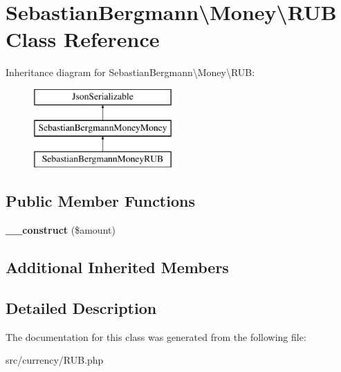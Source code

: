 \hypertarget{classSebastianBergmann_1_1Money_1_1RUB}{}\section{Sebastian\+Bergmann\textbackslash{}Money\textbackslash{}R\+U\+B Class Reference}
\label{classSebastianBergmann_1_1Money_1_1RUB}
Inheritance diagram for Sebastian\+Bergmann\textbackslash{}Money\textbackslash{}R\+U\+B\+:\begin{figure}[H]
\begin{center}
\leavevmode
\includegraphics[height=3.000000cm]{classSebastianBergmann_1_1Money_1_1RUB}
\end{center}
\end{figure}
\subsection*{Public Member Functions}
\begin{DoxyCompactItemize}
\item 
\hypertarget{classSebastianBergmann_1_1Money_1_1RUB_a00b5b98ef7e63dc0f433b54c321e185f}{}{\bfseries \+\_\+\+\_\+construct} (\$amount)\label{classSebastianBergmann_1_1Money_1_1RUB_a00b5b98ef7e63dc0f433b54c321e185f}

\end{DoxyCompactItemize}
\subsection*{Additional Inherited Members}


\subsection{Detailed Description}


The documentation for this class was generated from the following file\+:\begin{DoxyCompactItemize}
\item 
src/currency/R\+U\+B.\+php\end{DoxyCompactItemize}
